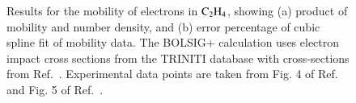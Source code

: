 \documentclass{warpdoc}
\let\citen\cite
\begin{document}
\begin{figure}
\centering
{}
\caption{Results for the mobility of electrons in ${\rm C_2H_4}$, showing (a) product of mobility and number density, and (b) error percentage of cubic spline fit of  mobility data. The BOLSIG+ calculation uses electron impact cross sections from the TRINITI database with cross-sections from Ref.\ \citen{phig:1987:yousfi}. Experimental data points are taken from Fig. 4 of Ref.\ \cite{jop:2011:takatou} and Fig. 5 of Ref.\ \cite{psst:2020:pinhao}.}
\label{fig:mobility_C2H4}
\end{figure}
%
\end{document}
